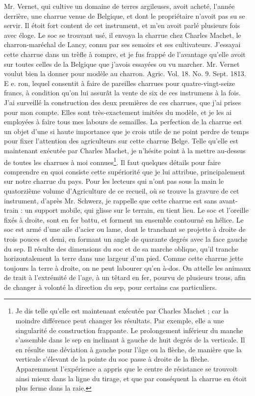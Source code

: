 Mr. Vernet, qui cultive un domaine de terres argileuses, avoit acheté, l'année derrière, une charrue venue de Belgique, et dont le propriétaire n'avoit pas su se servir. Il étoit fort content de cet instrument, et m'en avoit parlé plusieurs fois avec éloge. Le soc se trouvant usé, il envoya la charrue chez Charles Machet, le charron-maréchal de Lancy, connu par ses semoirs et ses cultivateurs. J'essayai cette charrue dans un trèfle à rompre, et je fus frappé de l'avantage qu'elle avoit sur toutes celles de la Belgique que j'avois essayées ou vu marcher. Mr. Vernet voulut bien la donner pour modèle au charron. Agric. Vol. 18. No. 9. Sept. 1813. E e.\setcounter{page}{362} ron, lequel consentit à faire de pareilles charrues pour quatre-vingt-seize francs, à condition qu'on lui assurât la vente de six de ces instrumens à la fois. J'ai surveillé la construction des deux premières de ces charrues, que j'ai prises pour mon compte. Elles sont très-exactement imitées du modèle, et je les ai employées à faire tous mes labours de semailles.
La perfection de la charrue est un objet d'une si haute importance que je crois utile de ne point perdre de temps pour fixer l'attention des agriculteurs sur cette charrue Belge. Telle qu'elle est maintenant exécutée par Charles Machet, je n'hésite point à la mettre au-dessus de toutes les charrues à moi connues\footnote{Je dis telle qu'elle est maintenant exécutée par Charles Machet ; car la moindre différence peut changer les résultats. Par exemple, elle a une singularité de construction frappante. Le prolongement inférieur du manche s'assemble dans le sep en inclinant à gauche de huit degrés de la verticale. Il en résulte une déviation à gauche pour l'âge ou la flèche, de manière que la verticale s'élevant de la pointe du soc passe à droite de la flèche. Apparemment l'expérience a appris que le centre de résistance se trouvoit ainsi mieux dans la ligne du tirage, et que par conséquent la charrue en étoit plus ferme dans la raie.}. Il faut quelques détails pour faire\setcounter{page}{363} comprendre en quoi consiste cette supériorité que je lui attribue, principalement sur notre charrue du pays. Pour les lecteurs qui n'ont pas sous la main le quatorzième volume d'Agriculture de ce recueil, où se trouve la gravure de cet instrument, d'après Mr. Schwerz, je rappelle que cette charrue est sans avant-train : un support mobile, qui glisse sur le terrain, en tient lieu. Le soc et l'oreille fixés à droite, sont en fer battu, et forment un ensemble contourné en hélice. Le soc est armé d'une aile d'acier ou lame, dont le tranchant se projette à droite de trois pouces et demi, en formant un angle de quarante degrés avec la face gauche du sep. Il résulte des dimensions du soc et de sa marche oblique, qu'il tranche horizontalement la terre dans une largeur d'un pied. Comme cette charrue jette toujours la terre à droite, on ne peut labourer qu'en à-dos. On attelle les animaux de trait à l'extrémité de l'age, à un têtard en fer, pourvu de plusieurs trous, afin de changer à volonté la direction du sep, pour certains cas particuliers.
